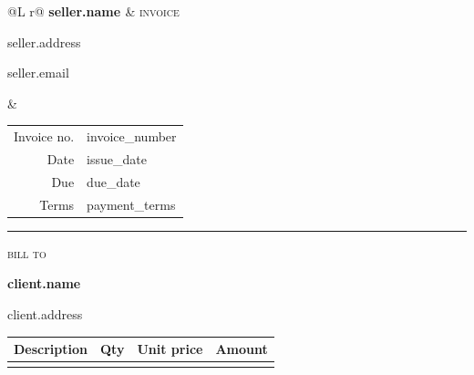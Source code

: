 \documentclass[10pt,a4paper]{article}
\newcommand{\fieldname}[1]{\textcolor{muted}{\footnotesize\scshape\MakeLowercase{#1}}}
\begin{document}
\color{ink}
{%
\begin{tabularx}{\linewidth}{@{}L r@{}}
  {\Large\bfseries\mbox{}{{ seller.name }}} & \textcolor{accent}{\fontsize{24}{26}\selectfont\scshape invoice} \\[6pt]
  \parbox[t]{0.55\linewidth}{\raggedright\small\mbox{}{{ seller.address }}\par\mbox{}{{ seller.email }}} &
  {\small\begin{tabular}[t]{@{}r@{\hspace{8pt}}l@{}}
    \textcolor{muted}{Invoice no.} & {{ invoice_number }} \\
    \textcolor{muted}{Date} & {{ issue_date }} \\
    \textcolor{muted}{Due} & {{ due_date }} \\
    \textcolor{muted}{Terms} & {{ payment_terms }}
  \end{tabular}}
\end{tabularx}

\vspace{10pt}
\textcolor{accent}{\rule{\linewidth}{0.8pt}}
\vspace{6pt}

\fieldname{Bill to}\par\vspace{2pt}
{\bfseries\mbox{}{{ client.name }}}\par
\parbox[t]{0.55\linewidth}{\raggedright\mbox{}{{ client.address }}}

\vspace{18pt}
{\renewcommand{\arraystretch}{1.45}\setlength{\LTpre}{0pt}\setlength{\LTpost}{0pt}\setlength{\LTleft}{0pt}\setlength{\LTright}{0pt}
\begin{longtable}{@{}>{\raggedright\arraybackslash}p{\dimexpr\linewidth-6\tabcolsep-12mm-26mm-26mm\relax} >{\raggedleft\arraybackslash}p{12mm} >{\raggedleft\arraybackslash}p{26mm} >{\raggedleft\arraybackslash}p{26mm}@{}}
  \toprule
  \textbf{Description} & \textbf{Qty} & \textbf{Unit price} & \textbf{Amount} \\
  \midrule
\endhead
  \bottomrule
\endfoot
  \bottomrule
\endlastfoot
{%
{%

}}
\end{longtable}}}
\end{document}

